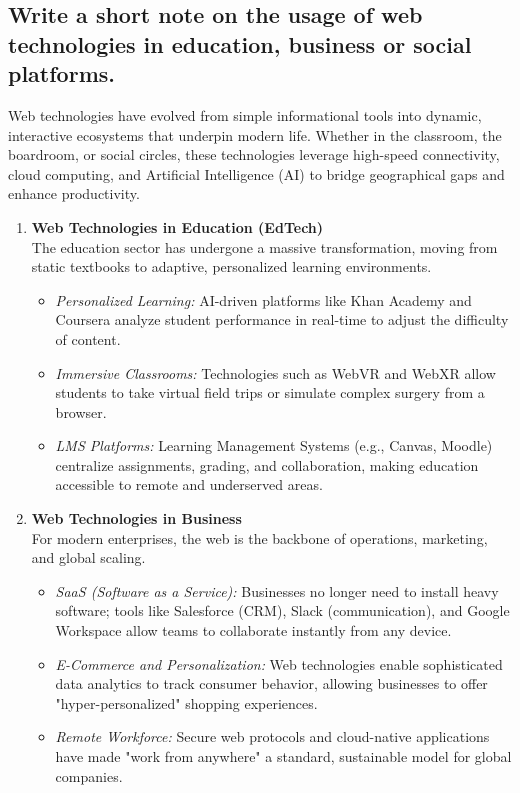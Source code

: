 \documentclass[a4paper,12pt]{article}
\begin{document}
\subsection{Write a short note on the usage of web technologies in education, business or social platforms.}

Web technologies have evolved from simple informational tools into dynamic, interactive ecosystems that underpin modern life. Whether in the classroom, the boardroom, or social circles, these technologies leverage high-speed connectivity, cloud computing, and Artificial Intelligence (AI) to bridge geographical gaps and enhance productivity.

\begin{enumerate}
    \item \textbf{Web Technologies in Education (EdTech)} \\
    The education sector has undergone a massive transformation, moving from static textbooks to adaptive, personalized learning environments.
    \begin{itemize}
        \item \textit{Personalized Learning:} AI-driven platforms like Khan Academy and Coursera analyze student performance in real-time to adjust the difficulty of content.
        \item \textit{Immersive Classrooms:} Technologies such as WebVR and WebXR allow students to take virtual field trips or simulate complex surgery from a browser.
        \item \textit{LMS Platforms:} Learning Management Systems (e.g., Canvas, Moodle) centralize assignments, grading, and collaboration, making education accessible to remote and underserved areas.
    \end{itemize}

    \item \textbf{Web Technologies in Business} \\
    For modern enterprises, the web is the backbone of operations, marketing, and global scaling.
    \begin{itemize}
        \item \textit{SaaS (Software as a Service):} Businesses no longer need to install heavy software; tools like Salesforce (CRM), Slack (communication), and Google Workspace allow teams to collaborate instantly from any device.
        \item \textit{E-Commerce and Personalization:} Web technologies enable sophisticated data analytics to track consumer behavior, allowing businesses to offer "hyper-personalized" shopping experiences.
        \item \textit{Remote Workforce:} Secure web protocols and cloud-native applications have made "work from anywhere" a standard, sustainable model for global companies.
    \end{itemize}


\end{enumerate}
\end{document}
